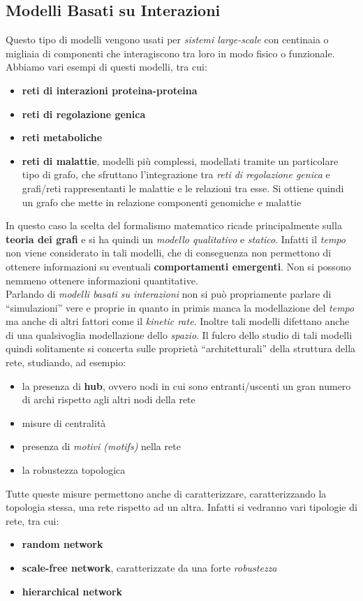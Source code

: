 \documentclass[a4paper,12pt, oneside]{book}
\begin{document}
\subsection{Modelli Basati su Interazioni}
Questo tipo di modelli vengono usati per \textit{sistemi large-scale} con
centinaia o migliaia di componenti che interagiscono tra loro in modo fisico o
funzionale. Abbiamo vari esempi di questi modelli, tra cui:
\begin{itemize}
  \item \textbf{reti di interazioni proteina-proteina}
  \item \textbf{reti di regolazione genica}
  \item \textbf{reti metaboliche}
  \item \textbf{reti di malattie}, modelli più complessi, modellati tramite un
  particolare tipo di grafo, che sfruttano
  l'integrazione tra \textit{reti di regolazione genica} e grafi/reti
  rappresentanti le malattie e le relazioni tra esse. Si ottiene quindi un grafo
  che mette in relazione componenti genomiche e malattie
\end{itemize}
In questo caso la scelta del formalismo matematico ricade principalmente sulla
\textbf{teoria dei grafi} e si ha quindi un \textit{modello qualitativo} e
\textit{statico}. Infatti il \textit{tempo} non viene considerato in tali
modelli, che di conseguenza non permettono di ottenere informazioni su
eventuali \textbf{comportamenti emergenti}. Non si possono nemmeno ottenere
informazioni quantitative.\\
Parlando di \textit{modelli basati su interazioni} non si può propriamente
parlare di ``simulazioni'' vere e proprie in quanto in primis manca la
modellazione del \textit{tempo} ma anche di altri fattori come il
\textit{kinetic rate}. Inoltre tali modelli difettano anche di una qualsivoglia
modellazione dello \textit{spazio}. Il fulcro dello studio di tali modelli
quindi solitamente si concerta sulle proprietà ``architetturali'' della
struttura della rete, studiando, ad esempio:
\begin{itemize}
  \item la presenza di \textbf{hub}, ovvero nodi in cui sono entranti/uscenti un
  gran numero di archi rispetto agli altri nodi della rete
  \item misure di centralità
  \item presenza di \textit{motivi (motifs)} nella rete
  \item la robustezza topologica
\end{itemize}
Tutte queste misure permettono anche di caratterizzare, caratterizzando la
topologia stessa, una rete rispetto ad un
altra. Infatti si vedranno vari tipologie di rete, tra cui:
\begin{itemize}
  \item \textbf{random network}
  \item \textbf{scale-free network}, caratterizzate da una forte
  \textit{robustezza}
  \item \textbf{hierarchical network}
\end{itemize}
\end{document}
